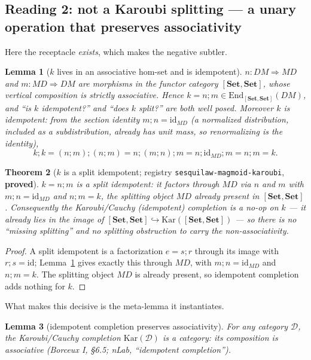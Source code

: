 \documentclass[11pt]{amsart}
\theoremstyle{plain}
\newtheorem{theorem}{Theorem}[section]
\newtheorem{lemma}[theorem]{Lemma}
\theoremstyle{definition}
\theoremstyle{remark}
\newcommand{\Set}{\mathbf{Set}}
\newcommand{\Kar}{\mathrm{Kar}}
\newcommand{\End}{\mathrm{End}}
\newcommand{\id}{\mathrm{id}}
\newcommand{\comp}{\mathbin{;}}
\begin{document}
\subsection{Reading 2: not a Karoubi splitting --- a unary operation that preserves associativity}
\label{sec:karoubi}

Here the receptacle \emph{exists}, which makes the negative subtler.

\begin{lemma}[$k$ lives in an associative hom-set and is idempotent]
\label{lem:k-idem}
$n\colon DM\Rightarrow MD$ and $m\colon MD\Rightarrow DM$ are morphisms in the functor category
$[\Set,\Set]$, whose vertical composition is strictly associative. Hence
$k=n\comp m\in\End_{[\Set,\Set]}(DM)$, and ``is $k$ idempotent?'' and ``does $k$ split?'' are both
well posed. Moreover $k$ is idempotent: from the section identity $m\comp n=\id_{MD}$ (a normalized
distribution, included as a subdistribution, already has unit mass, so renormalizing is the
identity),
\[
  k\comp k = (n\comp m)\comp(n\comp m) = n\comp(m\comp n)\comp m = n\comp\id_{MD}\comp m = n\comp m = k.
\]
\end{lemma}

\begin{theorem}[$k$ is a split idempotent; registry \texttt{sesquilaw-magmoid-karoubi}, \textbf{proved}]
\label{thm:split}
$k=n\comp m$ is a \emph{split} idempotent: it factors through $MD$ via $n$ and $m$ with
$m\comp n=\id_{MD}$ and $n\comp m=k$, the splitting object $MD$ already present in $[\Set,\Set]$.
Consequently the Karoubi/Cauchy (idempotent) completion is a \emph{no-op} on $k$ --- it already lies
in the image of $[\Set,\Set]\hookrightarrow\Kar([\Set,\Set])$ --- so there is no ``missing
splitting'' and no splitting obstruction to carry the non-associativity.
\end{theorem}

\begin{proof}
A split idempotent is a factorization $e=s\comp r$ through its image with $r\comp s=\id$;
Lemma~\ref{lem:k-idem} gives exactly this through $MD$, with $m\comp n=\id_{MD}$ and $n\comp m=k$.
The splitting object $MD$ is already present, so idempotent completion adds nothing for $k$.
\end{proof}

What makes this decisive is the meta-lemma it instantiates.

\begin{lemma}[idempotent completion preserves associativity]
\label{lem:meta}
For any category $\mathcal{D}$, the Karoubi/Cauchy completion $\Kar(\mathcal{D})$ is a
\emph{category}: its composition is associative (Borceux I, \S6.5; nLab, ``idempotent completion'').
\end{lemma}
\end{document}
